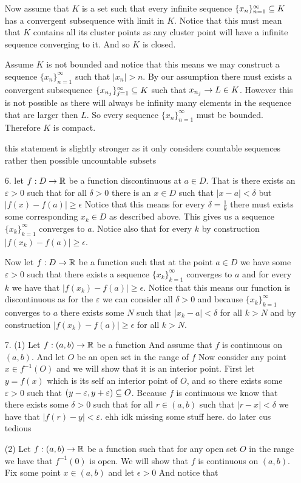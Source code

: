 \documentclass[12pt]{amsart}
\begin{document}
\begin{itemize}
        Now assume that $K$ is a set such that every infinite sequence
        $\{x_n\}_{n=1}^\infty\subseteq K$ has a convergent subsequence with limit in $K$.
        Notice that this must mean that $K$ contains all its cluster points as any
        cluster point will have a infinite sequence converging to it. And so $K$ is
        closed.

        Assume $K$ is not bounded and notice that this means we may construct a
        sequence $\{x_n\}_{n=1}^\infty$ such that $|x_n|>n$. By our assumption there
        must exists a convergent subsequence $\{x_{n_j}\}_{j=1}^\infty\subseteq K$ such that
        $x_{n_j}\rightarrow L\in K$. However this is not possible as there will always be
        infinity many elements in the sequence that are larger then $L$. So every
        sequence $\{x_n\}_{n=1}^\infty$ must be bounded. Therefore $K$ is compact.

        this statement is slightly stronger as it only considers countable sequences
        rather then possible uncountable subsets

    \item[6.] let $f:D\rightarrow\mathbb{R}$ be a function discontinuous at $a\in D$. That is there exists an
        $\varepsilon>0$ such that for all $\delta>0$ there is an $x\in D$ such that $|x-a|<\delta$
        but $|f(x)-f(a)|\geq \epsilon$
        Notice that this means for every $\delta = \frac{1}{k}$ there must exists some corresponding 
        $x_k\in D$ as described above.
        This gives us a sequence $\{x_k\}_{k=1}^\infty$ converges to $a$. Notice also that for every 
        $k$ by construction $|f(x_k)-f(a)|\geq \epsilon$.

        Now let $f:D\rightarrow\mathbb{R}$ be a function such that at the point $a\in D$ we have some
        $\varepsilon>0$ such that there exists a sequence $\{x_k\}_{k=1}^\infty$
        converges to $a$ and for every $k$ we have that $|f(x_k)-f(a)|\geq \epsilon$.
        Notice that this means our function is discontinuous as for the $\varepsilon$
        we can consider all $\delta>0$ and because $\{x_k\}_{k=1}^\infty$ converges to
        $a$ there exists some $N$ such that $|x_k-a|<\delta$ for all $k>N$ and by
        construction $|f(x_k)-f(a)|\geq \epsilon$ for all $k>N$.

    \item[7.] (1) Let $f:(a,b)\rightarrow\mathbb{R}$ be a function And assume that $f$ is continuous on $(a,b)$. 
              And let $O$ be an open set in the range of $f$ %
               Now consider any point $x\in f^{-1}(O)$ and we will show that it is an interior point. First let $y=f(x)$
               which is its self an interior point of $O$, and so there exists some $\varepsilon>0$ 
               such that $(y-\varepsilon, y+\varepsilon)\subseteq O$. Because $f$ is continuous we know that 
               there exists some $\delta>0$ such that for all $r\in (a,b)$ such that $|r-x|<\delta$ we have that $|f(r)-y|<\varepsilon$. ehh idk missing some stuff here. do later cus tedious

               (2)  Let $f:(a,b)\rightarrow\mathbb{R}$ be a function such that for any open set $O$ in the range we have that $f^{-1}(0)$ is open.
               We will show that $f$ is continuous on $(a,b)$. Fix some point $x\in (a,b)$ and let $\epsilon>0$ And notice that 

\end{itemize}
\end{document}
